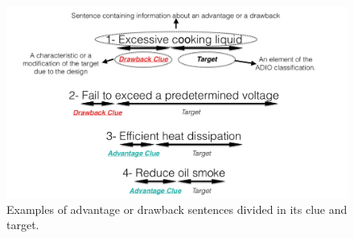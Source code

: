 \documentclass[]{book}
\begin{document}
\begin{figure}

{\centering \includegraphics[width=0.8\linewidth]{_bookdown_files/figures/audioexamplesent} 

}

\caption{Examples of advantage or drawback sentences divided in its clue and target.}\label{fig:audioexamplesent}
\end{figure}
\end{document}

